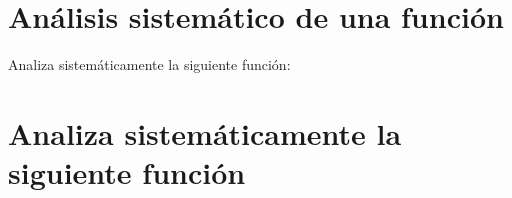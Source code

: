 \documentclass[nochap,palatino]{apuntes}
\begin{document}
\section{Análisis sistemático de una función}

Analiza sistemáticamente la siguiente función:



\newpage

\section{Analiza sistemáticamente la siguiente función}



\end{document}
